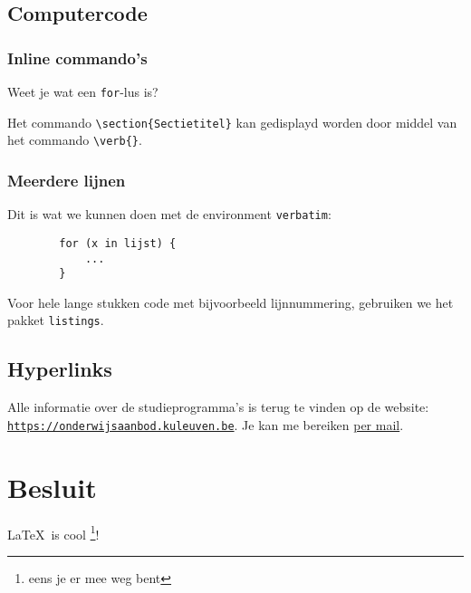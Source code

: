 \documentclass{article}
\begin{document}
	\subsection{Computercode}
	
	\subsubsection{Inline commando's}
	
	Weet je wat een \texttt{for}-lus is?
	
	Het commando \verb|\section{Sectietitel}| kan gedisplayd worden door middel van het commando \verb|\verb{}|.
	
	\subsubsection{Meerdere lijnen}
	
	Dit is wat we kunnen doen met de environment \texttt{verbatim}:
	
	\begin{verbatim}
		for (x in lijst) {
			...
		}
	\end{verbatim}
	
	Voor hele lange stukken code met bijvoorbeeld lijnnummering, gebruiken we het pakket \texttt{listings}.
	
	\subsection{Hyperlinks}
	
	Alle informatie over de studieprogramma's is terug te vinden op de website: \href{https://onderwijsaanbod.kuleuven.be}{\texttt{https://onderwijsaanbod.kuleuven.be}}. Je kan me bereiken  \href{mailto:vincent.vanschependom@student.kuleuven.be}{per mail}.
	
	\section*{Besluit}
	
	\LaTeX\ is cool \footnote{eens je er mee weg bent}!
	
\end{document}
